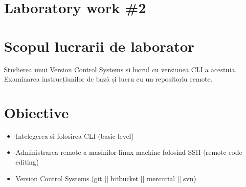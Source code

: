 \section*{Laboratory work \#2}

\section{Scopul lucrarii de laborator}
	Studierea unui Version Control Systems și lucrul cu versiunea CLI a acestuia. Examinarea instrucțiunilor de bază și lucru cu un repositoriu remote.
\section{Obiective}

	\begin{itemize}
		\item Intelegerea si folosirea CLI (basic level)
		\item Administrarea remote a masinilor linux machine folosind SSH (remote code editing)\item Version Control Systems (git || bitbucket || mercurial || svn)
	\end{itemize}

\clearpage